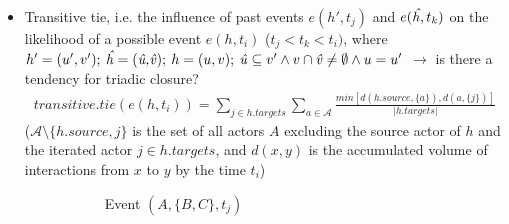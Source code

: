 \begin{itemize}
\begin{itemize}
		\item Transitive tie, i.e. the influence of past events $e(h',t_j)$ and $e(\text{\emph{\^h}},t_k)$ on the likelihood of a possible event $e(h,t_i)$ ($t_j < t_k < t_i)$, where $h' = (u',v'); \: \text{\emph{\^h}} = (\text{\emph{\^u,\^v}}); \: h = (u,v); \: \text{\emph{\^u}} \subseteq v' \land v \cap \text{\emph{\^v}} \neq \emptyset \land u = u'$ $\rightarrow$ is there a tendency for triadic closure?
		\begin{align*}
			transitive.tie(e(h,t_i)) = \sum_{j \in h.targets} \sum_{a \in \mathcal{A}} \frac{min[d(h.source,\{a\}),d(a,\{j\})]}{\lvert h.targets \rvert}
		\end{align*}
		($\mathcal{A} \setminus \{h.source,j\}$ is the set of all actors $A$ excluding the source actor of $h$ and the iterated actor $j \in h.targets$, and $d(x,y)$ is the accumulated volume of interactions from $x$ to $y$ by the time $t_i$)
		\begin{figure}
			\begin{mdframed}
				\centering
				\begin{subfigure}[t]{0.3\linewidth}
					\vskip 0pt
					\caption{Event $(A,\{B,C\},t_j)$}
				\end{subfigure}
				\hfill
				\begin{subfigure}[t]{0.3\linewidth}
					\vskip 0pt
\end{subfigure}
\end{mdframed}
\end{figure}
\end{itemize}
\end{itemize}
